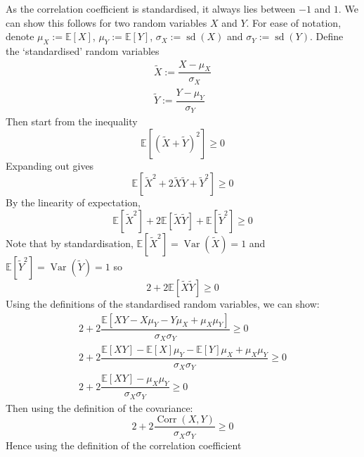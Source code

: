 \documentclass[11pt]{report} %
\begin{document}
As the correlation coefficient is standardised, it always lies between $-1$ and $1$. We can show this follows for two random variables $X$ and $Y$. For ease of notation, denote $\mu_{X} := \mathbb{E}\left[X\right]$, $\mu_{Y} := \mathbb{E}\left[Y\right]$, $\sigma_{X} := \operatorname{sd}\left(X\right)$ and $\sigma_{Y} := \operatorname{sd}\left(Y\right)$. Define the `standardised' random variables
\begin{gather}
\widetilde{X} := \dfrac{X - \mu_{X}}{\sigma_{X}} \\
\widetilde{Y} := \dfrac{Y - \mu_{Y}}{\sigma_{Y}}
\end{gather}
Then start from the inequality
\begin{equation}
\mathbb{E}\left[\left(\widetilde{X}+\widetilde{Y}\right)^{2}\right]\geq 0
\end{equation}
Expanding out gives
\begin{equation}
\mathbb{E}\left[\widetilde{X}^{2}+2\widetilde{X}\widetilde{Y}+\widetilde{Y}^{2}\right]\geq0
\end{equation}
By the linearity of expectation,
\begin{equation}
\mathbb{E}\left[\widetilde{X}^{2}\right]+2\mathbb{E}\left[\widetilde{X}\widetilde{Y}\right]+\mathbb{E}\left[\widetilde{Y}^{2}\right]\geq0
\end{equation}
Note that by standardisation, $\mathbb{E}\left[\widetilde{X}^{2}\right] = \operatorname{Var}\left(\widetilde{X}\right) = 1$ and $\mathbb{E}\left[\widetilde{Y}^{2}\right] = \operatorname{Var}\left(\widetilde{Y}\right) = 1$ so
\begin{equation}
2+2\mathbb{E}\left[\widetilde{X}\widetilde{Y}\right]\geq0
\end{equation}
Using the definitions of the standardised random variables, we can show:
\begin{gather}
2+2\dfrac{\mathbb{E}\left[XY-X\mu_{Y}-Y\mu_{X}+\mu_{X}\mu_{Y}\right]}{\sigma_{X}\sigma_{Y}}\geq0 \\
2+2\dfrac{\mathbb{E}\left[XY\right]-\mathbb{E}\left[X\right]\mu_{Y}-\mathbb{E}\left[Y\right]\mu_{X}+\mu_{X}\mu_{Y}}{\sigma_{X}\sigma_{Y}}\geq0 \\
2+2\dfrac{\mathbb{E}\left[XY\right]-\mu_{X}\mu_{Y}}{\sigma_{X}\sigma_{Y}}\geq0
\end{gather}
Then using the definition of the covariance:
\begin{equation}
2+2\dfrac{\operatorname{Corr}\left(X, Y\right)}{\sigma_{X}\sigma_{Y}}\geq0
\end{equation}
Hence using the definition of the correlation coefficient
\end{document}
